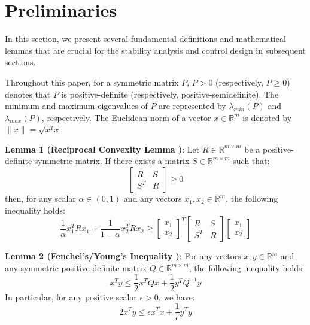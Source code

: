 \documentclass[letterpaper,journal]{IEEEtran}
\begin{document}
\section{Preliminaries}
In this section, we present several fundamental definitions and mathematical lemmas that are crucial for the stability analysis and control design in subsequent sections.

Throughout this paper, for a symmetric matrix $P$, $P > 0$ (respectively, $P \ge 0$) denotes that $P$ is positive-definite (respectively, positive-semidefinite). The minimum and maximum eigenvalues of $P$ are represented by $\lambda_{min}(P)$ and $\lambda_{max}(P)$, respectively. The Euclidean norm of a vector $x \in \mathbb{R}^m$ is denoted by $\|x\| = \sqrt{x^T x}$.

\textbf{Lemma 1 (Reciprocal Convexity Lemma \cite{ref_park_reciprocal})}: Let $R \in \mathbb{R}^{m \times m}$ be a positive-definite symmetric matrix. If there exists a matrix $S \in \mathbb{R}^{m \times m}$ such that:
\begin{equation}
\begin{bmatrix} R & S \\ S^T & R \end{bmatrix} \ge 0
\end{equation}
then, for any scalar $\alpha \in (0, 1)$ and any vectors $x_1, x_2 \in \mathbb{R}^m$, the following inequality holds:
\begin{equation}
\frac{1}{\alpha} x_1^T R x_1 + \frac{1}{1-\alpha} x_2^T R x_2 \ge \begin{bmatrix} x_1 \\ x_2 \end{bmatrix}^T \begin{bmatrix} R & S \\ S^T & R \end{bmatrix} \begin{bmatrix} x_1 \\ x_2 \end{bmatrix}
\end{equation}

\textbf{Lemma 2 (Fenchel's/Young's Inequality \cite{ref_boyd_convex})}: For any vectors $x, y \in \mathbb{R}^m$ and any symmetric positive-definite matrix $Q \in \mathbb{R}^{m \times m}$, the following inequality holds:
\begin{equation}
x^T y \le \frac{1}{2} x^T Q x + \frac{1}{2} y^T Q^{-1} y
\end{equation}
In particular, for any positive scalar $\epsilon > 0$, we have:
\begin{equation}
2 x^T y \le \epsilon x^T x + \frac{1}{\epsilon} y^T y
\end{equation}
\end{document}

